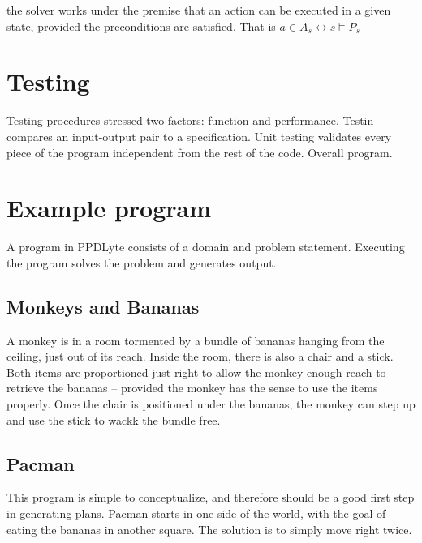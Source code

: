 \documentclass[
a4paper, %
11pt, %
onecolumn, %
openany, %
]{memoir}
\begin{document}
the solver works under the premise that an action can be executed in a given state, provided the preconditions are satisfied. That is $a \in A_{s} \leftrightarrow s \models P_{s}$

\section{Testing}
Testing procedures stressed two factors: function and performance. Testin compares an input-output pair to a specification. Unit testing validates every piece of the program independent from the rest of the code. Overall program. 

\section{Example program}
A program in PPDLyte consists of a domain and problem statement. Executing the program solves the problem and generates output.

\subsection{Monkeys and Bananas}
A monkey is in a room tormented by a bundle of bananas hanging from the ceiling, just out of its reach. Inside the room, there is also a chair and a stick. Both items are proportioned just right to allow the monkey enough reach to retrieve the bananas -- provided the monkey has the sense to use the items properly. Once the chair is positioned under the bananas, the monkey can step up and use the stick to wackk the bundle free. 
%

\subsection{Pacman}
This program is simple to conceptualize, and therefore should be a good first step in generating plans. Pacman starts in one side of the world, with the goal of eating the bananas in another square. The solution is to simply move right twice.\\
\end{document}
